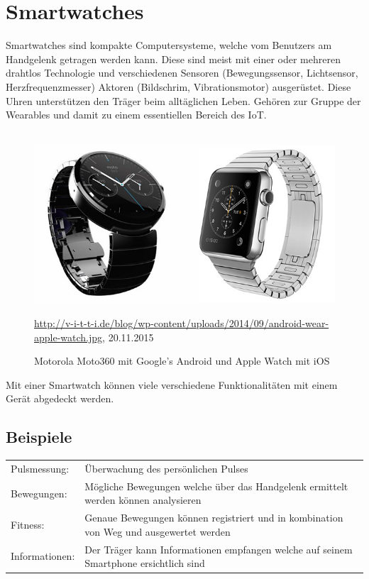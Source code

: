 \section{Smartwatches}
Smartwatches sind kompakte Computersysteme, welche vom Benutzers am Handgelenk getragen werden kann. Diese sind meist mit einer oder mehreren drahtlos Technologie und verschiedenen Sensoren (Bewegungssensor, Lichtsensor, Herzfrequenzmesser) Aktoren (Bildschrim, Vibrationsmotor) ausgerüstet.
Diese Uhren unterstützen den Träger beim alltäglichen Leben. Gehören zur Gruppe der Wearables und damit zu einem essentiellen Bereich des IoT. \\\\
\begin{figure}[h]
  \centering
  \includegraphics[scale=0.6]{98_Bilder/02_Grundlagen/androidwearapplewatch}
  \caption[Google's Android Wear und Apple Watch]{Motorola Moto360 mit Google's Android und Apple Watch mit iOS}
  \footnotesize \url{http://v-i-t-t-i.de/blog/wp-content/uploads/2014/09/android-wear-apple-watch.jpg}, 20.11.2015
\end{figure}


Mit einer Smartwatch können viele verschiedene Funktionalitäten mit einem Gerät abgedeckt werden.
\subsection{Beispiele}
\begin{tabular}{ll}
Pulsmessung: &	Überwachung des persönlichen Pulses \\
Bewegungen:	& Mögliche Bewegungen welche über das Handgelenk ermittelt werden können analysieren \\
Fitness: & Genaue Bewegungen können registriert und in kombination von Weg und ausgewertet werden \\
Informationen: & Der Träger kann Informationen empfangen welche auf seinem Smartphone ersichtlich sind
\end{tabular}

